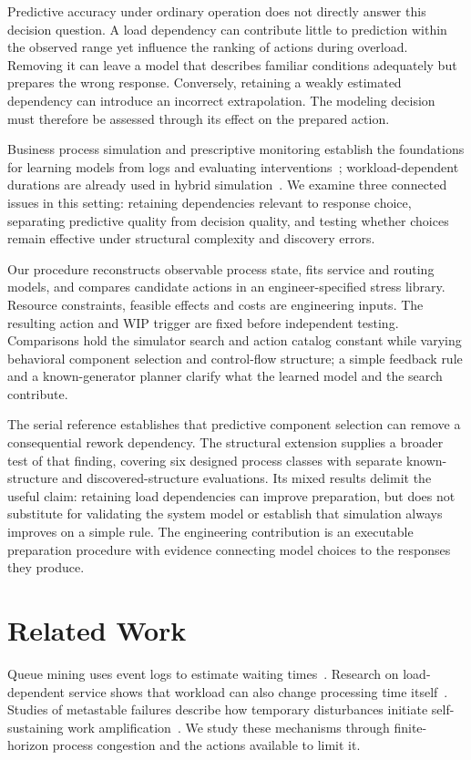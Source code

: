 Predictive accuracy under ordinary operation does not directly answer this decision question. A load dependency can contribute little to prediction within the observed range yet influence the ranking of actions during overload. Removing it can leave a model that describes familiar conditions adequately but prepares the wrong response. Conversely, retaining a weakly estimated dependency can introduce an incorrect extrapolation. The modeling decision must therefore be assessed through its effect on the prepared action.

Business process simulation and prescriptive monitoring establish the foundations for learning models from logs and evaluating interventions~\cite{simod,alarms,hybridpolicy,rlpolicies}; workload-dependent durations are already used in hybrid simulation~\cite{deepsimulator,hybridpolicy}. We examine three connected issues in this setting: retaining dependencies relevant to response choice, separating predictive quality from decision quality, and testing whether choices remain effective under structural complexity and discovery errors.

Our procedure reconstructs observable process state, fits service and routing models, and compares candidate actions in an engineer-specified stress library. Resource constraints, feasible effects and costs are engineering inputs. The resulting action and WIP trigger are fixed before independent testing. Comparisons hold the simulator search and action catalog constant while varying behavioral component selection and control-flow structure; a simple feedback rule and a known-generator planner clarify what the learned model and the search contribute.

The serial reference establishes that predictive component selection can remove a consequential rework dependency. The structural extension supplies a broader test of that finding, covering six designed process classes with separate known-structure and discovered-structure evaluations. Its mixed results delimit the useful claim: retaining load dependencies can improve preparation, but does not substitute for validating the system model or establish that simulation always improves on a simple rule. The engineering contribution is an executable preparation procedure with evidence connecting model choices to the responses they produce.

\section{Related Work}
Queue mining uses event logs to estimate waiting times~\cite{queue}. Research on load-dependent service shows that workload can also change processing time itself~\cite{load}. Studies of metastable failures describe how temporary disturbances initiate self-sustaining work amplification~\cite{metastable}. We study these mechanisms through finite-horizon process congestion and the actions available to limit it.

